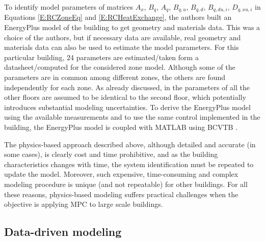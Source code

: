 \textcolor[rgb]{0,0,1}{To identify model parameters of matrices $A_x$, $B_q$, $A_q$, $B_{q,u}$, $B_{q,d}$, $B_{q,du,i}$, $D_{q,xu,i}$ in Equations \eqref{E:RCZoneEq} and \eqref{E:RCHeatExchange}, the authors built an EnergyPlus model of the building to get geometry and materials data. This was a choice of the authors, but if necessary data are available, real geometry and materials data can also be used to estimate the model parameters. For this particular building, 24 parameters are estimated/taken form a datasheet/computed for the considered zone model. Although some of the parameters are in common among different zones, the others are found independently for each zone. As already discussed, in \cite{SturzeneggerTR} the parameters of all the other floors are assumed to be identical to the second floor, which potentially introduces substantial modeling uncertainties. To derive the EnergyPlus model using the available measurements and to use the same control implemented in the building, the EnergyPlus model is coupled with MATLAB using BCVTB \cite{Wetter2015}.}


\textcolor[rgb]{0,0,1}{The physics-based approach described above, although detailed and accurate (in some cases), is clearly cost and time prohibitive, and as the building characteristics changes with time, the system identification must be repeated to update the model. Moreover, such expensive, time-consuming and complex modeling procedure is unique (and not repeatable) for other buildings. For all these reasons, physics-based modeling suffers practical challenges when the objective is applying MPC to large scale buildings.
} 






\subsection{Data-driven modeling}

